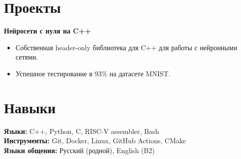\documentclass[a4paper,10pt]{article}
\begin{document}
\section{Проекты}
\textbf{Нейросети с нуля на C++} \\
\begin{itemize}
  \item Собственная header-only библиотека для C++ для работы с нейронными сетями.
  \item Успешное тестирование в 93\% на датасете MNIST.
\end{itemize}

\section{Навыки}
\textbf{Языки:} C++, Python, C, RISC-V assembler, Bash\\
\textbf{Инструменты:} Git, Docker, Linux, GitHub Actions, CMake\\
\textbf{Языки общения:} Русский (родной), English (B2)
\end{document}
